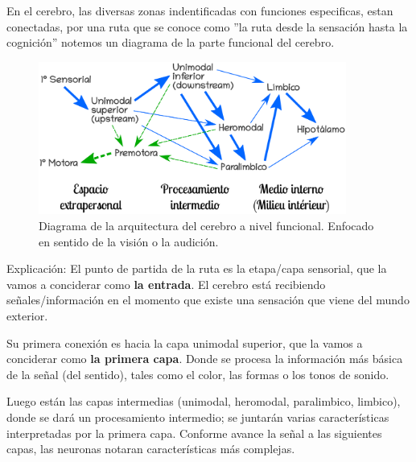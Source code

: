 En el cerebro, las diversas zonas indentificadas con funciones especificas, estan conectadas, por una ruta que se conoce como 
 ''la ruta desde la sensación hasta la cognición'' notemos un diagrama de la parte funcional del cerebro. \cite{sensAcogn}  


 \begin{figure}[h]
  \centering
  \includegraphics[width=0.9\textwidth]{../Figuras/zonasFuncionales.png}
  \caption{Diagrama de la arquitectura del cerebro a nivel funcional. Enfocado en sentido de la visión o la audición. \parencite{Mesulam1998}}
  \label{fig:zonasFun}
 \end{figure}

Explicación: El punto de partida de la ruta es la etapa/capa sensorial, que la vamos a conciderar como \textbf{la entrada}. El cerebro está recibiendo señales/información en el momento que existe una sensación que viene del mundo exterior.

Su primera conexión es hacia la capa unimodal superior, que la vamos a conciderar como \textbf{la primera capa}. Donde se procesa la información más básica de la señal (del sentido), tales como el color, las formas o los tonos de sonido.

Luego están las capas intermedias (unimodal, heromodal, paralimbico, limbico), donde se dará un procesamiento intermedio; se juntarán varias características interpretadas por la primera capa. Conforme avance la señal a las siguientes capas, las neuronas notaran características más complejas. 



